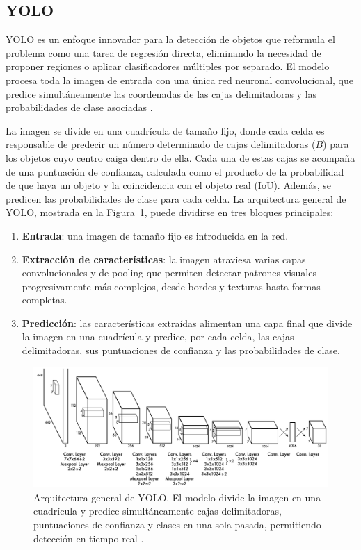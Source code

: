 \documentclass[../main.tex]{subfiles}
\begin{document}
\subsection{YOLO}

YOLO es un enfoque innovador para la detección de objetos que reformula el problema como una tarea de regresión directa, eliminando la necesidad de proponer regiones o aplicar clasificadores múltiples por separado. El modelo procesa toda la imagen de entrada con una única red neuronal convolucional, que predice simultáneamente las coordenadas de las cajas delimitadoras y las probabilidades de clase asociadas \cite{redmon2016lookonceunifiedrealtime}.

La imagen se divide en una cuadrícula de tamaño fijo, donde cada celda es responsable de predecir un número determinado de cajas delimitadoras ($B$) para los objetos cuyo centro caiga dentro de ella. Cada una de estas cajas se acompaña de una puntuación de confianza, calculada como el producto de la probabilidad de que haya un objeto y la coincidencia con el objeto real (IoU). Además, se predicen las probabilidades de clase para cada celda. La arquitectura general de YOLO, mostrada en la Figura~\ref{fig:yolo_arquitectura}, puede dividirse en tres bloques principales:

\begin{enumerate}
    \item \textbf{Entrada}: una imagen de tamaño fijo es introducida en la red.
    \item \textbf{Extracción de características}: la imagen atraviesa varias capas convolucionales y de pooling que permiten detectar patrones visuales progresivamente más complejos, desde bordes y texturas hasta formas completas.
    \item \textbf{Predicción}: las características extraídas alimentan una capa final que divide la imagen en una cuadrícula y predice, por cada celda, las cajas delimitadoras, sus puntuaciones de confianza y las probabilidades de clase.
\end{enumerate}

\begin{figure}[H]
    \centering
    \includegraphics[width=0.7\linewidth]{imgs/fundamentos/yolo_arquitectura.png}
    \caption{Arquitectura general de YOLO. El modelo divide la imagen en una cuadrícula y predice simultáneamente cajas delimitadoras, puntuaciones de confianza y clases en una sola pasada, permitiendo detección en tiempo real \cite{yolo}.}
    \label{fig:yolo_arquitectura}
\end{figure}
\end{document}
